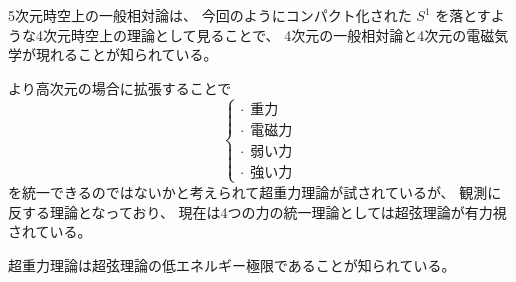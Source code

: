 \documentclass{article}
\begin{document}
5次元時空上の一般相対論は、
今回のようにコンパクト化された
$S^{1}$
を落とすような4次元時空上の理論として見ることで、
4次元の一般相対論と4次元の電磁気学が現れることが知られている。

より高次元の場合に拡張することで
\begin{equation*}
	\begin{cases}
		\cdot \ \ \text{重力}  \\
		\cdot \ \ \text{電磁力} \\
		\cdot \ \ \text{弱い力} \\
		\cdot \ \ \text{強い力}
	\end{cases}
\end{equation*}
を統一できるのではないかと考えられて超重力理論が試されているが、
観測に反する理論となっており、
現在は4つの力の統一理論としては超弦理論が有力視されている。

超重力理論は超弦理論の低エネルギー極限であることが知られている。
\end{document}
